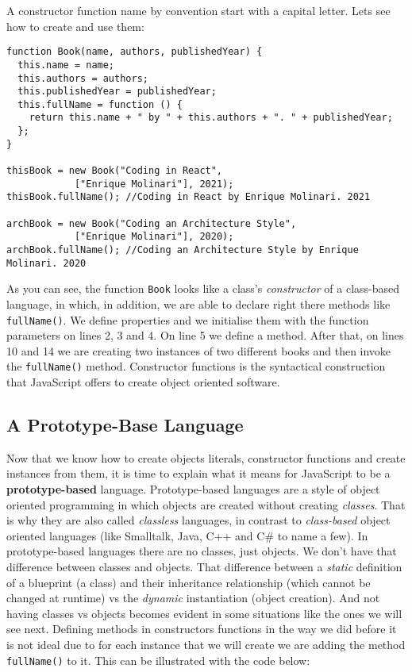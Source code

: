 \documentclass[a4paper, oneside, titlepage, 12pt]{book}
\begin{document}
A constructor function name by convention start with a capital letter. Lets see how to create and use them:

\begin{verbatim}
function Book(name, authors, publishedYear) {
  this.name = name;
  this.authors = authors;
  this.publishedYear = publishedYear;
  this.fullName = function () {
    return this.name + " by " + this.authors + ". " + publishedYear;
  };
}

thisBook = new Book("Coding in React", 
			["Enrique Molinari"], 2021);
thisBook.fullName(); //Coding in React by Enrique Molinari. 2021

archBook = new Book("Coding an Architecture Style", 
			["Enrique Molinari"], 2020);
archBook.fullName(); //Coding an Architecture Style by Enrique Molinari. 2020 
\end{verbatim}

As you can see, the function \texttt{Book} looks like a class's \textit{constructor} of a class-based language, in which, in addition, we are able to declare right there methods like \texttt{fullName()}. We define properties and we initialise them with the function parameters on lines 2, 3 and 4. On line 5 we define a method. After that, on lines 10 and 14 we are creating two instances of two different books and then invoke the \texttt{fullName()} method. Constructor functions is the syntactical construction that JavaScript offers to create object oriented software.

\subsection{A Prototype-Base Language}

Now that we know how to create objects literals, constructor functions and create instances from them, it is time to explain what it means for JavaScript to be a \textbf{prototype-based} language. Prototype-based languages are a style of object oriented programming in which objects are created without creating \textit{classes}. That is why they are also called \textit{classless} languages, in contrast to \textit{class-based} object oriented languages (like Smalltalk, Java, C++ and C\# to name a few). In prototype-based languages there are no classes, just objects. We don't have that difference between classes and objects. That difference between a \textit{static} definition of a blueprint (a class) and their inheritance relationship (which cannot be changed at runtime) vs the \textit{dynamic} instantiation (object creation). And not having classes vs objects becomes evident in some situations like the ones we will see next. 
Defining methods in constructors functions in the way we did before it is not ideal due to for each instance that we will create we are adding the method \texttt{fullName()} to it. This can be illustrated with the code below:
\end{document}
